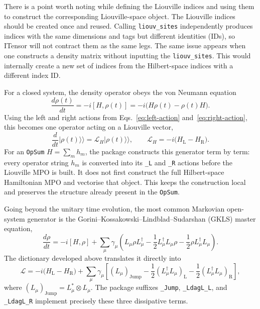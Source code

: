 There is a point worth noting while defining the Liouville indices and using them to construct the corresponding Liouville-space object.
The Liouville indices should be created once and reused.
Calling \texttt{liouv\_sites} independently produces indices with the same dimensions and tags but different identities (IDs), so ITensor will not contract them as the same legs.
The same issue appears when one constructs a density matrix without inputting the \texttt{liouv\_sites}.
This would internally create a new set of indices from the Hilbert-space indices with a different index ID.

For a closed system, the density operator obeys the von Neumann equation
%
\begin{equation}
    \frac{d\rho(t)}{dt}
    =
    -i[H,\rho(t)]
    =
    -i\bigl(H\rho(t)-\rho(t)H\bigr).
    \label{eq:von-neumann-equation}
\end{equation}
%
Using the left and right actions from Eqs.~\eqref{eq:left-action} and~\eqref{eq:right-action}, this becomes one operator acting on a Liouville vector,
%
\begin{equation}
    \frac{d}{dt}\lvert\rho(t)\rangle\!\rangle
    = \mathcal L_H\lvert\rho(t)\rangle\!\rangle, \qquad \mathcal L_H=-i\bigl(H_{\mathrm L}-H_{\mathrm R}\bigr).
    \label{eq:hamiltonian-liouvillian}
\end{equation}
%
For an \texttt{OpSum} \(H=\sum_m h_m\), the package constructs this generator term by term: every operator string \(h_m\) is converted into its \texttt{\_L} and \texttt{\_R} actions before the Liouville MPO is built.
It does not first construct the full Hilbert-space Hamiltonian MPO and vectorise that object.
This keeps the construction local and preserves the structure already present in the \texttt{OpSum}.

Going beyond the unitary time evolution, the most common Markovian open-system generator is the Gorini--Kossakowski--Lindblad--Sudarshan (GKLS) master equation,
%
\begin{equation}
    \frac{d\rho}{dt}
    =
    -i[H,\rho]
    + \sum_{\mu}\gamma_{\mu} \left(
        L_{\mu}\rho L_{\mu}^{\dagger}
        -\frac{1}{2}L_{\mu}^{\dagger}L_{\mu}\rho
        -\frac{1}{2}\rho L_{\mu}^{\dagger}L_{\mu} \right).
    \label{eq:gkls-master-equation}
\end{equation}
%
The dictionary developed above translates it directly into
%
\begin{equation}
    \mathcal L
    =
    -i\bigl(H_{\mathrm L}-H_{\mathrm R}\bigr)
    + \sum_{\mu}\gamma_{\mu} \left[ (L_{\mu})_{\mathrm{Jump}}
        -\frac{1}{2}(L_{\mu}^{\dagger}L_{\mu})_{\mathrm L}
        -\frac{1}{2}(L_{\mu}^{\dagger}L_{\mu})_{\mathrm R} \right],
    \label{eq:gkls-liouville-generator}
\end{equation}
%
where \((L_{\mu})_{\mathrm{Jump}}=L_{\mu}^{*}\otimes L_{\mu}\).
The package suffixes \texttt{\_Jump}, \texttt{\_LdagL\_L}, and \texttt{\_LdagL\_R} implement precisely these three dissipative terms.

